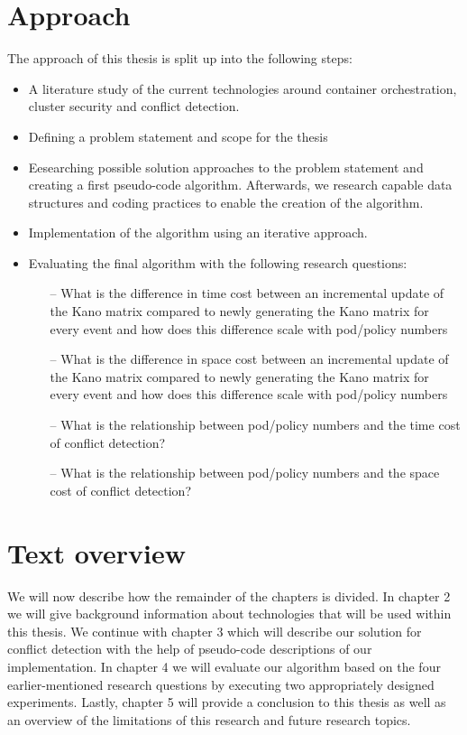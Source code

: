 \section{Approach } \label{sec:approach}
The approach of this thesis is split up into the following steps:
\begin{itemize}
    \renewcommand{\labelitemi}{\scriptsize$\blacksquare$}
     \item A literature study of the current technologies around container orchestration, cluster security and conflict detection.
    \item Defining a problem statement and scope for the thesis
    \item Eesearching possible solution approaches to the problem statement and creating a first pseudo-code algorithm. Afterwards, we research capable data structures and coding practices to enable the creation of the algorithm.
    \item Implementation of the algorithm using an iterative approach.
    \item Evaluating the final algorithm with the following research questions:

    \begin{enumerate}
        \item[--] What is the difference in time cost between an incremental update of the Kano matrix compared to newly generating the Kano matrix for every event and how does this difference scale with pod/policy numbers
        \item[--] What is the difference in space cost between an incremental update of the Kano matrix compared to newly generating the Kano matrix for every event and how does this difference scale with pod/policy numbers
        \item[--] What is the relationship between pod/policy numbers and the time cost of conflict detection?
        \item[--] What is the relationship between pod/policy numbers and the space cost of conflict detection?
    \end{enumerate}
\end{itemize}


\section{Text overview} \label{sec:textoverview}
We will now describe how the remainder of the chapters is divided. In chapter 2 we will give background information about technologies that will be used within this thesis. We continue with chapter 3 which will describe our solution for conflict detection with the help of pseudo-code descriptions of our implementation. In chapter 4  we will evaluate our algorithm based on the four earlier-mentioned research questions by executing two appropriately designed experiments. Lastly, chapter 5 will provide a conclusion to this thesis as well as an overview of the limitations of this research and future research topics.
\cleardoublepage

